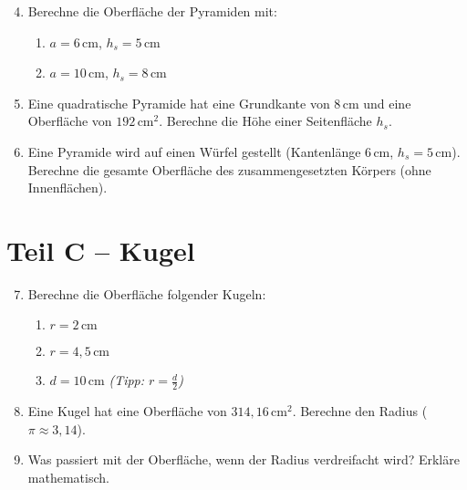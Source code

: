 \begin{enumerate}
    \setcounter{enumi}{3}
    \item Berechne die Oberfläche der Pyramiden mit:
    \begin{enumerate}
        \item \( a = 6\,\text{cm} \), \( h_s = 5\,\text{cm} \)
        \item \( a = 10\,\text{cm} \), \( h_s = 8\,\text{cm} \)
    \end{enumerate}

    \item Eine quadratische Pyramide hat eine Grundkante von \( 8\,\text{cm} \) und eine Oberfläche von \( 192\,\text{cm}^2 \). Berechne die Höhe einer Seitenfläche \( h_s \).

    \item Eine Pyramide wird auf einen Würfel gestellt (Kantenlänge \( 6\,\text{cm} \), \( h_s = 5\,\text{cm} \)). Berechne die gesamte Oberfläche des zusammengesetzten Körpers (ohne Innenflächen).
\end{enumerate}

\vspace{1em}

\section{Teil C – Kugel}

\begin{enumerate}
    \setcounter{enumi}{6}
    \item Berechne die Oberfläche folgender Kugeln:
    \begin{enumerate}
        \item \( r = 2\,\text{cm} \)
        \item \( r = 4{,}5\,\text{cm} \)
        \item \( d = 10\,\text{cm} \) \quad \textit{(Tipp: \( r = \frac{d}{2} \))}
    \end{enumerate}

    \item Eine Kugel hat eine Oberfläche von \( 314{,}16\,\text{cm}^2 \). Berechne den Radius (\( \pi \approx 3{,}14 \)).

    \item Was passiert mit der Oberfläche, wenn der Radius verdreifacht wird? Erkläre mathematisch.
\end{enumerate}

\vspace{1em}

